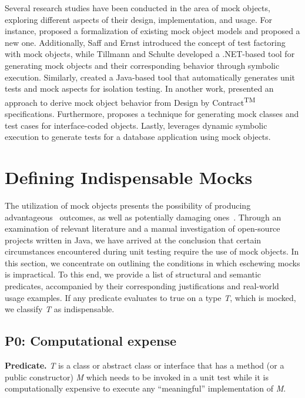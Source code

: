 \documentclass[conference]{IEEEtran}
\begin{document}
Several research studies have been conducted in the area of mock objects, exploring different aspects of their design, implementation, and usage. For instance, \citeauthor{mockobjmodels} \cite{mockobjmodels} proposed a formalization of existing mock object models and proposed a new one. Additionally, Saff and Ernst \cite{mockobjectfortestrefactor} introduced the concept of test factoring with mock objects, while Tillmann and Schulte \cite{mockobjgen} developed a .NET-based tool for generating mock objects and their corresponding behavior through symbolic execution. Similarly, \citeauthor{genutest2} \cite{genutest2} created a Java-based tool that automatically generates unit tests and mock aspects for isolation testing. In another work, \citeauthor{extractmockbehavior} \cite{extractmockbehavior} presented an approach to derive mock object behavior from Design by Contract\textsuperscript{TM} specifications. Furthermore, \cite{interfaceoodmock} proposes a technique for generating mock classes and test cases for interface-coded objects. Lastly, \citeauthor{moda} \cite{moda} leverages dynamic symbolic execution to generate tests for a database application using mock objects.

\section{Defining Indispensable Mocks}
The utilization of mock objects presents the possibility of producing advantageous~\cite{endotesting}\cite{mockobjects} outcomes, as well as potentially damaging ones~\cite{langr2004don}. Through an examination of relevant literature and a manual investigation of open-source projects written in Java, we have arrived at the conclusion that certain circumstances encountered during unit testing require the use of mock objects. In this section, we concentrate on outlining the conditions in which eschewing mocks is impractical. To this end, we provide a list of structural and semantic predicates, accompanied by their corresponding justifications and real-world usage examples. If any predicate evaluates to true on a type \textit{T}, which is mocked, we classify \textit{T} as indispensable.

\subsection{P0: Computational expense}
\textbf{Predicate. } \textit{T} is a class or abstract class or interface that has a method (or a public constructor) \textit{M} which needs to be invoked in a unit test while it is computationally expensive to execute any ``meaningful'' implementation of \textit{M}.
\end{document}
